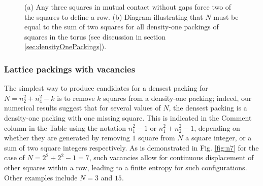 \documentclass[aps]{revtex4}
\begin{document}
\begin{figure}[H]
\caption{\label{fig:aligned} (a) Any three squares in mutual contact without gaps force two of the squares to define a row. (b) Diagram illustrating that $N$ must be equal to the sum of two squares for all density-one packings of squares in the torus (see discussion in section \ref{sec:densityOnePackings}).}
\end{figure} 

\subsubsection{Lattice packings with vacancies}
\label{sec:vacancies}
The simplest way to produce candidates for a densest packing for $N=n_2^2 + n_4^2-k$ is to remove $k$ squares from a density-one packing; indeed, our numerical results suggest that for several values of $N$, the densest packing is a density-one packing with one missing square.  This is indicated in the Comment column in the Table using the notation $n_1^2-1$ or $n_1^2+ n_2^2-1$, depending on whether they are generated by removing $1$ square from $N$ a square integer, or a sum of two square integers respectively.  As is demonstrated in Fig. \ref{fig:n7} for the case of $N=2^2+2^2-1=7$, such vacancies allow for continuous displacement of other squares within a row, leading to a finite entropy for such configurations.  Other examples include $N=3$ and $15$.
\end{document}
